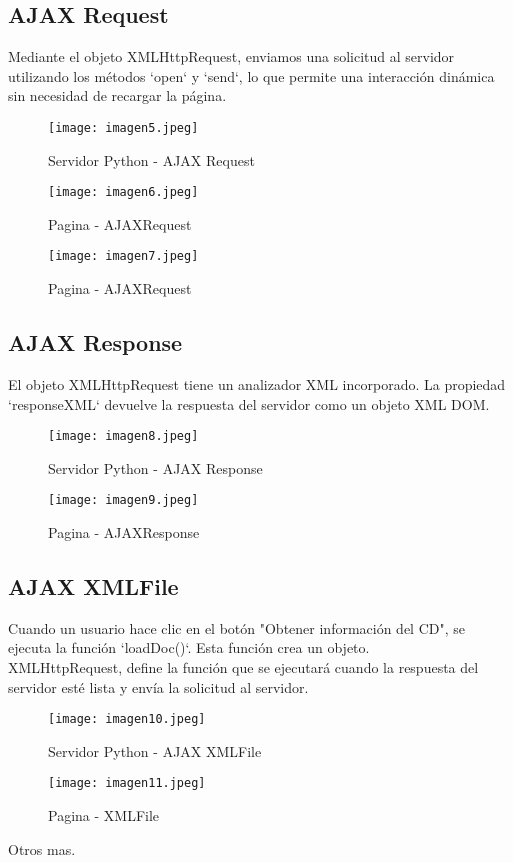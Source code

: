 \documentclass[10pt, a4paper]{article}
\begin{document}
	\subsection*{AJAX Request}
	\begin{flushleft}
		Mediante el objeto XMLHttpRequest, enviamos una solicitud al servidor utilizando los métodos `open` y `send`, lo que permite una interacción dinámica sin necesidad de recargar la página.
	\end{flushleft}
	\begin{figure}[h]
		\centering
		\texttt{[image: imagen5.jpeg]}
		\caption{Servidor Python - AJAX Request}
	\end{figure}
	\begin{figure}[h]
		\centering
		\texttt{[image: imagen6.jpeg]}
		\caption{Pagina - AJAXRequest}
	\end{figure} 
	\begin{figure}[h]
		\centering
		\texttt{[image: imagen7.jpeg]}
		\caption{Pagina - AJAXRequest}
	\end{figure}
	\vspace*{18em}
	\subsection*{AJAX Response}
	\begin{flushleft}
		El objeto XMLHttpRequest tiene un analizador XML incorporado. La propiedad `responseXML` devuelve la respuesta del servidor como un objeto XML DOM.
	\end{flushleft}
	\begin{figure}[h]
		\centering
		\texttt{[image: imagen8.jpeg]}
		\caption{Servidor Python - AJAX Response}
	\end{figure}
	\begin{figure}[h]
		\centering
		\texttt{[image: imagen9.jpeg]}
		\caption{Pagina - AJAXResponse}
	\end{figure} 
	\vspace*{19em}
	\subsection*{AJAX XMLFile}
	\begin{flushleft}
		Cuando un usuario hace clic en el botón "Obtener información del CD", se ejecuta la función `loadDoc()`. Esta función crea un objeto. \\
		XMLHttpRequest, define la función que se ejecutará cuando la respuesta del servidor esté lista y envía la solicitud al servidor.
	\end{flushleft}
	\begin{figure}[h]
		\centering
		\texttt{[image: imagen10.jpeg]}
		\caption{Servidor Python - AJAX XMLFile}
	\end{figure}
	\begin{figure}[h]
		\centering
		\texttt{[image: imagen11.jpeg]}
		\caption{Pagina - XMLFile}
	\end{figure} 
	\begin{flushleft}
		Otros mas.
	\end{flushleft} \vspace*{2em}
\end{document}
